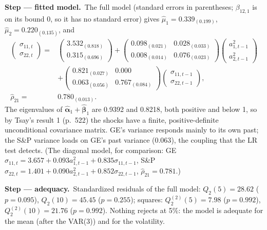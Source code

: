 \documentclass[11pt,a4paper]{article}
\newcommand{\passo}[2]{\par\smallskip\noindent\textbf{Step --- #1.}~#2}
\begin{document}
\begin{sol}
\passo{fitted model}{The full model (standard errors in parentheses; $\beta_{12,1}$ is on its bound 0, so it has
no standard error) gives $\hat\mu_1=0.339_{(0.199)}$, $\hat\mu_2=0.220_{(0.135)}$, and
\begin{align}
\begin{pmatrix}\sigma_{11,t}\\ \sigma_{22,t}\end{pmatrix}={}&
\begin{pmatrix}3.532_{(0.818)}\\0.315_{(0.696)}\end{pmatrix}
+\begin{pmatrix}0.098_{(0.021)}&0.028_{(0.033)}\\0.008_{(0.014)}&0.076_{(0.023)}\end{pmatrix}
\begin{pmatrix}a_{1,t-1}^2\\a_{2,t-1}^2\end{pmatrix}\nonumber\\
&+\begin{pmatrix}0.821_{(0.027)}&0.000\\0.063_{(0.056)}&0.767_{(0.084)}\end{pmatrix}
\begin{pmatrix}\sigma_{11,t-1}\\ \sigma_{22,t-1}\end{pmatrix},\nonumber\\
\hat\rho_{21}={}&0.780_{(0.013)}.\nonumber
\end{align}
The eigenvalues of $\hat{\bm\alpha}_1+\hat{\bm\beta}_1$ are 0.9392 and 0.8218, both positive and below 1, so
by Tsay's result 1 (p.~522) the shocks have a finite, positive-definite unconditional covariance matrix.
GE's variance responds mainly to its own past; the S\&P variance loads on GE's past variance
($0.063$), the coupling that the LR test detects. (The diagonal model, for comparison: GE
$\sigma_{11,t}=3.657+0.093a_{1,t-1}^2+0.835\sigma_{11,t-1}$, S\&P $\sigma_{22,t}=1.401+0.090a_{2,t-1}^2+0.852\sigma_{22,t-1}$,
$\hat\rho_{21}=0.781$.)}

\passo{adequacy}{Standardized residuals of the full model: $Q_2(5)=28.62$ ($p=0.095$), $Q_2(10)=45.45$
($p=0.255$); squares: $Q_2^{(2)}(5)=7.98$ ($p=0.992$), $Q_2^{(2)}(10)=21.76$ ($p=0.992$). Nothing rejects at
5\%: the model is adequate for the mean (after the VAR(3)) and for the volatility.}


\end{sol}
\end{document}
